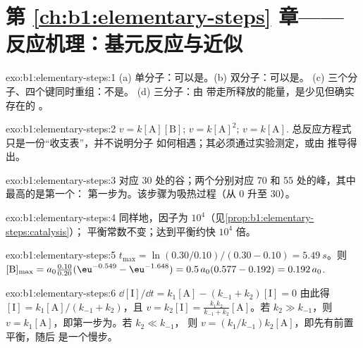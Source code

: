 \section*{第 \ref{ch:b1:elementary-steps} 章——反应机理：基元反应与近似}

\begin{solution}{exo:b1:elementary-steps:1}
(a) 单分子：可以是。(b) 双分子：可以是。
(c) 三个分子、四个键同时重组：不是。
(d) 三分子：由  带走所释放的能量，是少见但确实存在的
。
\end{solution}

\begin{solution}{exo:b1:elementary-steps:2}
$v = k[\mathrm{A}][\mathrm{B}]$; $v = k[\mathrm{A}]^2$; $v = k[\mathrm{A}]$.
总反应方程式只是一份“收支表”，并不说明分子
如何相遇；其必须通过实验测定，或由
推导得出。
\end{solution}

\begin{solution}{exo:b1:elementary-steps:3}
对应 30 处的谷；两个分别对应
70 和 55 处的峰，其中最高的是第一个：
第一步为。该步骤为吸热过程（从 0 升至 30）。
\end{solution}

\begin{solution}{exo:b1:elementary-steps:4}
同样地，因子为 $10^4$（见\cref{prop:b1:elementary-steps:catalysis}）；
平衡常数不变；达到平衡约快
$10^4$ 倍。
\end{solution}

\begin{solution}{exo:b1:elementary-steps:5}
$t_{\max} = \ln(0.30/0.10)/(0.30 - 0.10) = \qty{5.49}{s}$。则
$[\mathrm{B}]_{\max} = a_0\frac{0.10}{0.20}(\eu^{-0.549} - \eu^{-1.648}) =
0.5\,a_0(0.577 - 0.192) = 0.192\,a_0$.
\end{solution}

\begin{solution}{exo:b1:elementary-steps:6}
$\dd[\mathrm{I}]/\dd t = k_1[\mathrm{A}] - (k_{-1} + k_2)[\mathrm{I}] = 0$
由此得 $[\mathrm{I}] = k_1[\mathrm{A}]/(k_{-1} + k_2)$，且 $v = k_2[\mathrm{I}]
= \frac{k_1k_2}{k_{-1}+k_2}[\mathrm{A}]$。若 $k_2 \gg k_{-1}$，则 $v =
k_1[\mathrm{A}]$，即第一步为。若 $k_2 \ll k_{-1}$，
则 $v = (k_1/k_{-1})k_2[\mathrm{A}]$，即先有前置平衡，随后
是一个慢步。
\end{solution}

